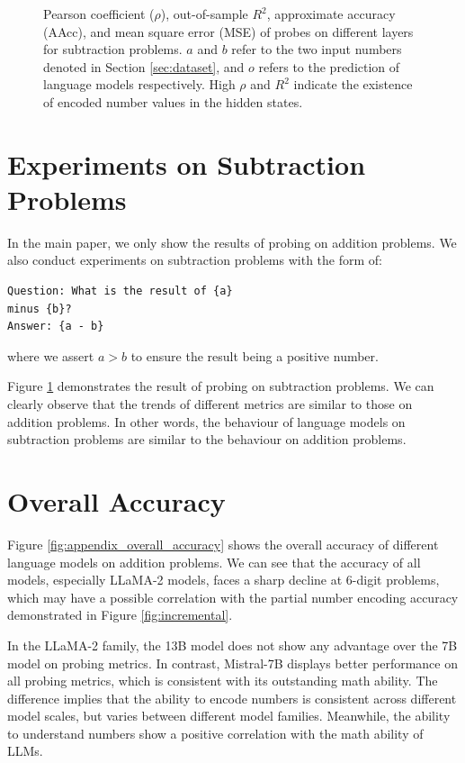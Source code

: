 \documentclass[11pt]{article}
\begin{document}
\begin{figure}[htbp]
{    }
    \caption{Pearson coefficient ($\rho$), out-of-sample $R^2$, approximate accuracy (AAcc), and mean square error (MSE) of probes on different layers for subtraction problems. $a$ and $b$ refer to the two input numbers denoted in Section \ref{sec:dataset}, and $o$ refers to the prediction of language models respectively. High $\rho$ and $R^2$ indicate the existence of encoded number values in the hidden states.}
    \label{fig:appendix_subtraction_results}
\end{figure}

\section{Experiments on Subtraction Problems}
\label{sec:appendix_subtract}
In the main paper, we only show the results of probing on addition problems.
We also conduct experiments on subtraction problems with the form of:
\begin{verbatim}
Question: What is the result of {a} 
minus {b}? 
Answer: {a - b}
\end{verbatim}
where we assert $a > b$ to ensure the result being a positive number.

Figure \ref{fig:appendix_subtraction_results} demonstrates the result of probing on subtraction problems.
We can clearly observe that the trends of different metrics are similar to those on addition problems.
In other words, the behaviour of language models on subtraction problems are similar to the behaviour on addition problems.

\section{Overall Accuracy}
\label{sec:appendix_overall_accuracy}
Figure \ref{fig:appendix_overall_accuracy} shows the overall accuracy of different language models on addition problems.
We can see that the accuracy of all models, especially LLaMA-2 models, faces a sharp decline at 6-digit problems, which may have a possible correlation with the partial number encoding accuracy demonstrated in Figure \ref{fig:incremental}.

In the LLaMA-2 family, the 13B model does not show any advantage over the 7B model on probing metrics.
In contrast, Mistral-7B displays better performance on all probing metrics, which is consistent with its outstanding math ability.
The difference implies that the ability to encode numbers is consistent across different model scales, but varies between different model families.
Meanwhile, the ability to understand numbers show a positive correlation with the math ability of LLMs.
\end{document}
